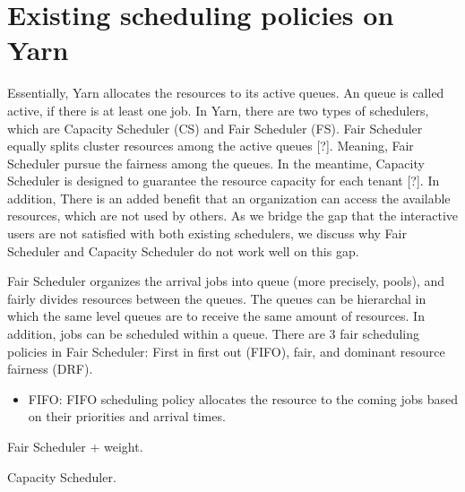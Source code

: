 \section{Existing scheduling policies on Yarn}


Essentially, Yarn allocates the resources to its active queues. An queue is called active, if there is at least one job. In Yarn, there are two types of schedulers, which are Capacity Scheduler (CS) and Fair Scheduler (FS). Fair Scheduler equally splits cluster resources among the active queues [?]. Meaning, Fair Scheduler pursue the fairness among the queues. In the meantime, Capacity Scheduler is designed to guarantee the resource capacity for each tenant [?]. In addition, There is an added benefit that an organization can access the available resources, which are not used by others. As we bridge the gap that the interactive users are not satisfied with both existing schedulers, we discuss why Fair Scheduler and Capacity Scheduler do not work well on this gap.


Fair Scheduler organizes the arrival jobs into queue (more precisely, pools), and fairly divides resources between the queues. The queues can be hierarchal in which the same level queues are to receive the same amount of resources. In addition, jobs can be scheduled within a queue. There are 3 fair scheduling policies in Fair Scheduler: First in first out (FIFO), fair, and dominant resource fairness (DRF). 

\begin{itemize}
\item FIFO: FIFO scheduling policy allocates the resource to the coming jobs based on their priorities and arrival times.
\end{itemize}


Fair Scheduler + weight.

Capacity Scheduler.

